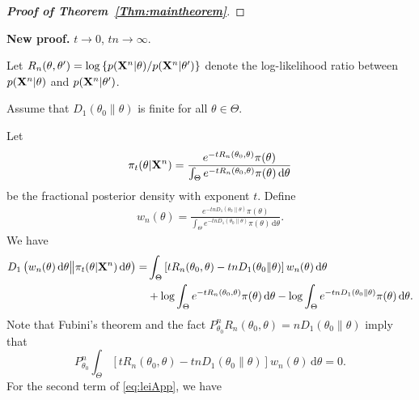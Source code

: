 \documentclass[11pt]{article}
\theoremstyle{plain}
\theoremstyle{definition}
\theoremstyle{remark}
\begin{document}
\begin{appendices}
\begin{proof}[\textbf{Proof of Theorem~\ref{Thm:maintheorem}}]
    \end{proof}

    \vspace{3em}
    \noindent \textbf{New proof.}
    $t \to 0$, $tn \to \infty$.

    Let $R_n (\theta, \theta' )= \log \left\{ p(\mathbf{X}^{n}|\theta)/ p(\mathbf{X}^{n}|\theta') \right\}$ denote the log-likelihood ratio between $p(\mathbf{X}^{n} | \theta )$ and $ p(\mathbf{X}^{n} | \theta' )$.

    Assume that $D_1(\theta_0 \| \theta)$ is finite for all $\theta \in \Theta$.


       Let
       \begin{align*}
           \pi_t( \theta | \mathbf{X}^{n})
           =
           \frac{
               e^{-t R_n (\theta_0, \theta)} \pi(\theta) 
           }{
           \int_{\Theta}  e^{-t R_n (\theta_0, \theta)} \pi(\theta) \, \mathrm d \theta
           }
       \end{align*}
       be the fractional posterior density with exponent $t$.
       Define
       \begin{align*}
           w_n(\theta) = \frac{
               e^{ -t n D_1\left( \theta_0 \| \theta \right) } \pi(\theta)
           }{
               \int_{\Theta} e^{ -t n D_1\left( \theta_0 \| \theta \right) } \pi(\theta) \, \mathrm d \theta
           }.
       \end{align*}
We have
\begin{equation}\label{eq:leiApp}
    \begin{aligned}
     D_1\left( 
        w_n (\theta) \, \mathrm d \theta
        \big\|
        \pi_t (\theta | \mathbf{X}^{n}) \, \mathrm d \theta
    \right)
    = &
    \int_{\Theta}
    \left[   t R_n(\theta_0, \theta) - tn D_1 (\theta_0 \| \theta )  \right]
    w_n (\theta) \, \mathrm d \theta
    \\
    &
    + \log \int_{\Theta} e^{-t R_n (\theta_0, \theta)} \pi (\theta) \, \mathrm d \theta  
    -\log \int_\Theta e^{-tn D_1 \left( \theta_0 \| \theta \right)} \pi(\theta) \, \mathrm d \theta
    .
    \end{aligned}
\end{equation}
Note that Fubini's theorem and the fact $P_{\theta_0}^n R_n (\theta_0, \theta) = n D_1 (\theta_0 \| \theta)$ imply that
\begin{equation*}
P_{\theta_0}^n\int_{\Theta}
    \left[   t R_n(\theta_0, \theta) - tn D_1 (\theta_0 \| \theta )  \right]
    w_n (\theta) \, \mathrm d \theta
    =0
    .
\end{equation*}
For the second term of \eqref{eq:leiApp}, we have

\end{appendices}
\end{document}
